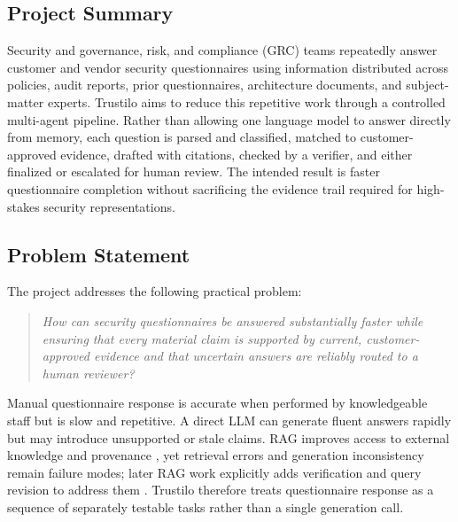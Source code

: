 \documentclass[11pt,journal,onecolumn]{IEEEtran}
\begin{document}
\subsection{Project Summary}
Security and governance, risk, and compliance (GRC) teams repeatedly answer customer and vendor security questionnaires using information distributed across policies, audit reports, prior questionnaires, architecture documents, and subject-matter experts. Trustilo aims to reduce this repetitive work through a controlled multi-agent pipeline. Rather than allowing one language model to answer directly from memory, each question is parsed and classified, matched to customer-approved evidence, drafted with citations, checked by a verifier, and either finalized or escalated for human review. The intended result is faster questionnaire completion without sacrificing the evidence trail required for high-stakes security representations.

\subsection{Problem Statement}
The project addresses the following practical problem:

\begin{quote}
\emph{How can security questionnaires be answered substantially faster while ensuring that every material claim is supported by current, customer-approved evidence and that uncertain answers are reliably routed to a human reviewer?}
\end{quote}

Manual questionnaire response is accurate when performed by knowledgeable staff but is slow and repetitive. A direct LLM can generate fluent answers rapidly but may introduce unsupported or stale claims. RAG improves access to external knowledge and provenance \cite{lewis2020rag}, yet retrieval errors and generation inconsistency remain failure modes; later RAG work explicitly adds verification and query revision to address them \cite{he2024covrag}. Trustilo therefore treats questionnaire response as a sequence of separately testable tasks rather than a single generation call.
\end{document}
